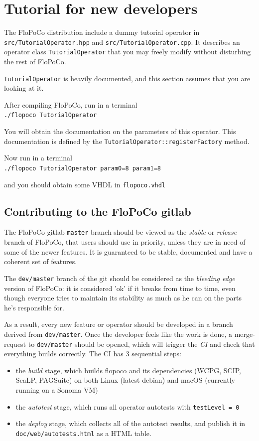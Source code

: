 \documentclass{article}
\begin{document}
\section{Tutorial for new developers \label{sec:tutorial}}

The FloPoCo distribution include a dummy tutorial operator in \texttt{src/TutorialOperator.hpp} and \texttt{src/TutorialOperator.cpp}.
It describes an operator class \texttt{TutorialOperator} that you may freely modify without disturbing the rest of FloPoCo.

\texttt{TutorialOperator} is heavily documented, and this section assumes that you are looking at it.

After compiling FloPoCo, run in a terminal\\
\verb!./flopoco TutorialOperator!

You will obtain the documentation on the parameters of this operator.
This documentation is defined by the \texttt{TutorialOperator::registerFactory} method.

Now run in a terminal\\
\verb!./flopoco TutorialOperator param0=8 param1=8!

and you should obtain  some VHDL in \texttt{flopoco.vhdl}

\subsection{Contributing to the FloPoCo gitlab}
The FloPoCo gitlab \texttt{master} branch should be viewed as the \textit{stable} or \textit{release} branch of FloPoCo, that users should use in priority, unless they are in need of some of the newer features. It is guaranteed to be stable, documented and have a coherent set of features.

The \texttt{dev/master} branch of the git should be considered as the \textit{bleeding edge} version of FloPoCo: it is considered 'ok' if it breaks from time to time, even though everyone tries to maintain its stability as much as he can on the parts he's responsible for.

As a result, every new feature or operator should be developed in a branch derived from \texttt{dev/master}. 
Once the developer feels like the work is done, a merge-request to \texttt{dev/master} should be opened, which will trigger the \textit{CI} and check that everything builds correctly. The CI has 3 sequential steps: 
\begin{itemize}
  \item the \textit{build} stage, which builds flopoco and its dependencies (WCPG, SCIP, ScaLP, PAGSuite) on both Linux (latest debian) and macOS (currently running on a Sonoma VM)
  \item the \textit{autotest} stage, which runs all operator autotests with \texttt{testLevel = 0}
  \item the \textit{deploy} stage, which collects all of the autotest results, and publish it in \texttt{doc/web/autotests.html} as a HTML table.
\end{itemize}
\end{document}
